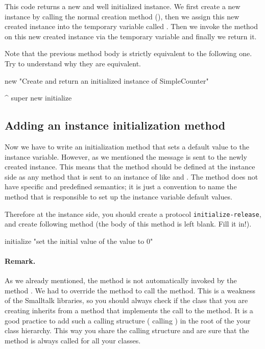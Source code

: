 This code returns a new and well initialized instance. We first
create a new instance by calling the normal creation method
(), then we assign this new created instance
into the temporary variable called . Then we
invoke the  method on this new created instance
via the temporary variable and finally we return it.

Note that the previous method body is strictly equivalent to
the following one. Try to understand why they are equivalent.

\begin{code}
new
   "Create and return an initialized instance of SimpleCounter"

   ^ super new initialize
\end{code}

\subsection*{Adding an instance initialization method}
Now we have to write an initialization method that sets a default
value to the  instance variable. However, as
we mentioned the  message is sent to the newly
created instance. This means that the  method
should be defined at the instance side as any method that is sent
to an instance of  like 
and . The  method does not
have specific and predefined semantics; it is just a convention to
name the method that is responsible to set up the instance
variable default values.

Therefore at the instance side, you should create a protocol
\texttt{initialize-release}, and create following method (the body
of this method is left blank. Fill it in!).

\begin{code}
initialize
   "set the initial value of the value to 0"
\end{code}

\paragraph{Remark.} As we already mentioned, the  
method is not automatically invoked by the method .
We had to override the method  to call the
 method. This is a weakness of the Smalltalk
libraries, so you should always check if the class that you are
creating inherits from a  method that implements the
call to the  method. It is a good practice to
add such a calling structure ( calling
) in the root of the your class hierarchy. This
way you share the calling structure and are sure that the
 method is always called for all your classes.


